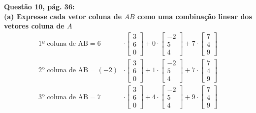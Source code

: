 \documentclass[a4paper,12pt]{article}
\begin{document}
\textbf{Questão 10, pág. 36:}\\
\textbf{(a) Expresse cada vetor coluna de $AB$ como uma combinação linear dos vetores coluna de $A$}
\begin{align*}
    \text{1º coluna de AB} =
    6 &\cdot
    \begin{bmatrix}
        3 \\
        6 \\
        0
    \end{bmatrix}
    + 0 \cdot 
    \begin{bmatrix}
        -2 \\
         5 \\
         4
    \end{bmatrix} 
    + 7 \cdot
    \begin{bmatrix}
        7 \\
        4 \\
        9
    \end{bmatrix} \\
    \text{2º coluna de AB} =
    (-2) &\cdot
    \begin{bmatrix}
        3 \\
        6 \\
        0
    \end{bmatrix}
    + 1 \cdot 
    \begin{bmatrix}
        -2 \\
         5 \\
         4
    \end{bmatrix} 
    + 7 \cdot
    \begin{bmatrix}
        7 \\
        4 \\
        9
    \end{bmatrix} \\
    \text{3º coluna de AB} =
    7 &\cdot
    \begin{bmatrix}
        3 \\
        6 \\
        0
    \end{bmatrix}
    + 4 \cdot 
    \begin{bmatrix}
        -2 \\
         5 \\
         4
    \end{bmatrix} 
    + 9 \cdot
    \begin{bmatrix}
        7 \\
        4 \\
        9
    \end{bmatrix}
\end{align*}
\end{document}

